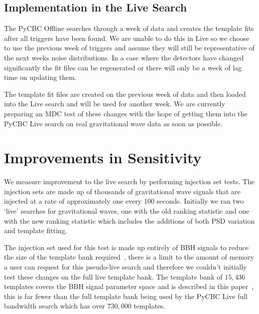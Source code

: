 \subsection{Implementation in the Live Search}
The PyCBC Offline searches through a week of data and creates the template fits after all triggers have been found. We are unable to do this in Live so we choose to use the previous week of triggers and assume they will still be representative of the next weeks noise distributions. In a case where the detectors have changed significantly the fit files can be regenerated or there will only  be a week of lag time on updating them.

The template fit files are created on the previous week of data and then loaded into the Live search and will be used for another week. We are currently preparing an MDC test of these changes with the hope of getting them into the PyCBC Live search on real gravitational wave data as soon as possible.







\section{\label{sec:pycbclive-sensitivity-improvements}Improvements in Sensitivity}

We measure improvement to the live search by performing injection set tests. The injection sets are made up of thousands of gravitational wave signals that are injected at a rate of approximately one every $100$ seconds. Initially we ran two `live' searches for gravitational waves, one with the old ranking statistic and one with the new ranking statistic which includes the additions of both PSD variation and template fitting.

The injection set used for this test is made up entirely of BBH signals to reduce the size of the template bank required~\cite{gwtc3}, there is a limit to the amount of memory a user can request for this pseudo-live search and therefore we couldn't initially test these changes on the full live template bank. The template bank of $15,436$ templates covers the BBH signal parameter space and is described in this paper~\cite{gwtc3}, this is far fewer than the full template bank being used by the PyCBC Live full bandwidth search which has over $730,000$ templates.

